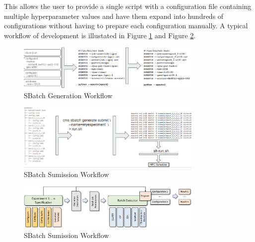 This allows the user to provide a single script with a configuration file containing multiple hyperparameter values and have them expand into hundreds of configurations without having to prepare each configuration manually.
A typical workflow of development is illustated in Figure \ref{fig:sbatch} and Figure \ref{fig:sbatch-submit}.

\begin{figure}[p]
    \centering
    \includegraphics[width=0.8\textwidth]{images/sbatch-template.png}
    \caption{SBatch Generation Workflow}\label{fig:sbatch}
\end{figure}

\begin{figure}[p]
    \centering
    \includegraphics[width=0.8\textwidth]{images/sbatch-submit.png}
    \caption{SBatch Sumission Workflow}\label{fig:sbatch-submit}
\end{figure}



\begin{figure}[htb]
    \centering
    \includegraphics[width=0.8\textwidth]{images/sbatch.pdf}
    \caption{SBatch Sumission Workflow}\label{fig:sbatch-2}
\end{figure}


